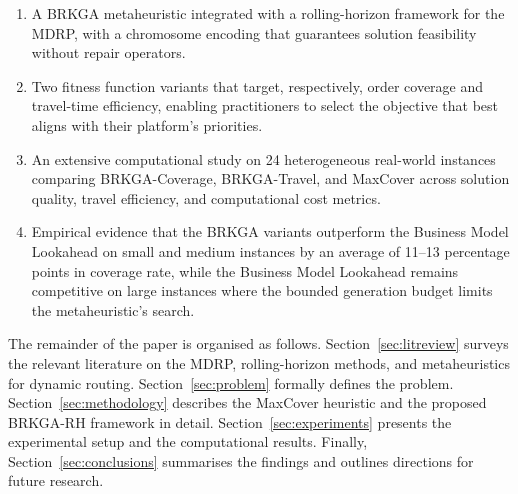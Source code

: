 \begin{enumerate}
    \item A BRKGA metaheuristic integrated with a rolling-horizon
    framework for the MDRP, with a chromosome encoding that
    guarantees solution feasibility without repair operators.

    \item Two fitness function variants that target, respectively,
    order coverage and travel-time efficiency, enabling
    practitioners to select the objective that best aligns with
    their platform's priorities.

    \item An extensive computational study on 24 heterogeneous
    real-world instances comparing BRKGA-Coverage, BRKGA-Travel,
    and MaxCover across solution quality, travel efficiency,
    and computational cost metrics.

    \item Empirical evidence that the BRKGA variants outperform
    the Business Model Lookahead on small and medium instances
    by an average of 11--13 percentage points in coverage rate,
    while the Business Model Lookahead remains competitive on
    large instances where the bounded generation budget limits
    the metaheuristic's search.
\end{enumerate}

The remainder of the paper is organised as follows.
Section~\ref{sec:litreview} surveys the relevant literature on
the MDRP, rolling-horizon methods, and metaheuristics for
dynamic routing.
Section~\ref{sec:problem} formally defines the problem.
Section~\ref{sec:methodology} describes the MaxCover heuristic
and the proposed BRKGA-RH framework in detail.
Section~\ref{sec:experiments} presents the experimental setup
and the computational results.
Finally, Section~\ref{sec:conclusions} summarises the findings
and outlines directions for future research.

